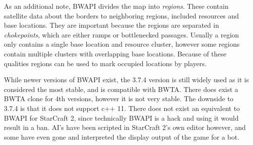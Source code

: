 		As an additional note, BWAPI divides the map into \emph{regions}. These contain satellite data about the borders to neighboring regions, included resources and base locations. They are important because the regions are separated in \emph{chokepoints}, which are either ramps or bottlenecked passages. Usually a region only contains a single base location and resource cluster, however some regions contain multiple clusters with overlapping base locations. Because of these qualities regions can be used to mark occupied locations by players.
		
		While newer versions of BWAPI exist, the 3.7.4 version is still widely used as it is considered the most stable, and is compatible with BWTA. There does exist a BWTA clone for 4th versions, however it is not very stable. The downside to 3.7.4 is that it does not support c++ 11. There does not exist an equivalent to BWAPI for StarCraft 2, since technically BWAPI is a hack and using it would result in a ban. AI's have been scripted in StarCraft 2's own editor however, and some have even gone and interpreted the display output of the game for a bot.
		
